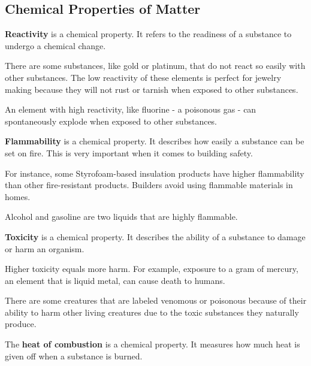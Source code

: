 
\subsection*{Chemical Properties of Matter}
\label{sub_sec:chemical_properties_of_matter}

\begin{definition}[Reactivity]
  \textbf{Reactivity} is a chemical property. It refers to the readiness of a substance to undergo a chemical change.

  There are some substances, like gold or platinum, that do not react so easily
  with other substances. The low reactivity of these elements is perfect for
  jewelry making because they will not rust or tarnish when exposed to other
  substances.

  An element with high reactivity, like fluorine - a poisonous gas - can spontaneously explode when exposed to other substances.
\end{definition}

\begin{definition}[Flammability]
  \textbf{Flammability} is a chemical property. It describes how easily a
  substance can be set on fire. This is very important when it comes to
  building safety.

  For instance, some Styrofoam-based insulation products have higher
  flammability than other fire-resistant products. Builders avoid using
  flammable materials in homes.

  Alcohol and gasoline are two liquids that are highly flammable.
\end{definition}

\begin{definition}[Toxicity]
  \textbf{Toxicity} is a chemical property. It describes the ability of a
  substance to damage or harm an organism.

  Higher toxicity equals more harm. For example, exposure to a gram of mercury,
  an element that is liquid metal, can cause death to humans.
  
  There are some creatures that are labeled venomous or poisonous because of
  their ability to harm other living creatures due to the toxic substances they
  naturally produce.
\end{definition}

\begin{definition}
  The \textbf{heat of combustion} is a chemical property. It measures how much
  heat is given off when a substance is burned.
\end{definition}

